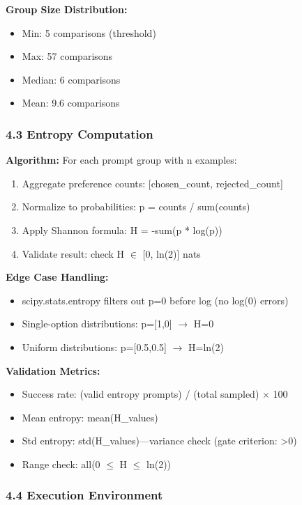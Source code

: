 \textbf{Group Size Distribution:}
\begin{itemize}
\item Min: 5 comparisons (threshold)
\item Max: 57 comparisons
\item Median: 6 comparisons
\item Mean: 9.6 comparisons
\end{itemize}

\subsubsection{4.3 Entropy Computation}

\textbf{Algorithm:}
For each prompt group with n examples:
\begin{enumerate}
\item Aggregate preference counts: [chosen\_count, rejected\_count]
\item Normalize to probabilities: p = counts / sum(counts)
\item Apply Shannon formula: H = -sum(p * log(p))
\item Validate result: check H $\in$ [0, ln(2)] nats
\end{enumerate}

\textbf{Edge Case Handling:}
\begin{itemize}
\item scipy.stats.entropy filters out p=0 before log (no log(0) errors)
\item Single-option distributions: p=[1,0] $\rightarrow$ H=0
\item Uniform distributions: p=[0.5,0.5] $\rightarrow$ H=ln(2)
\end{itemize}

\textbf{Validation Metrics:}
\begin{itemize}
\item Success rate: (valid entropy prompts) / (total sampled) $\times$ 100
\item Mean entropy: mean(H\_values)
\item Std entropy: std(H\_values)---variance check (gate criterion: >0)
\item Range check: all(0 $\leq$ H $\leq$ ln(2))
\end{itemize}

\subsubsection{4.4 Execution Environment}

